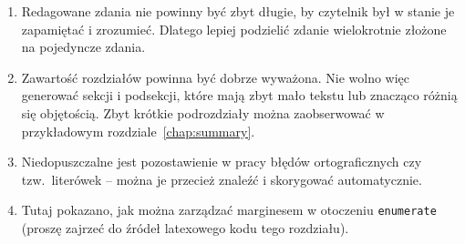 \begin{enumerate}[labelwidth=\widthof{\ref{last-item}},label=\arabic*.]
\item Redagowane zdania nie powinny być zbyt długie, by czytelnik był w stanie je zapamiętać i zrozumieć. Dlatego lepiej podzielić zdanie wielokrotnie złożone na pojedyncze zdania.
\item Zawartość rozdziałów powinna być dobrze wyważona. Nie wolno więc generować sekcji i podsekcji, które mają zbyt mało tekstu lub znacząco różnią się objętością. Zbyt krótkie podrozdziały można zaobserwować w przykładowym rozdziale~\ref{chap:summary}.
\item Niedopuszczalne jest pozostawienie w pracy błędów ortograficznych czy tzw.\ literówek -- można je przecież znaleźć i skorygować automatycznie. \addtocounter{enumi}{1000} 
\item  Tutaj pokazano, jak można zarządzać marginesem w otoczeniu \texttt{enumerate} (proszę zajrzeć do źródeł latexowego kodu tego rozdziału). \label{last-item}
\end{enumerate}

